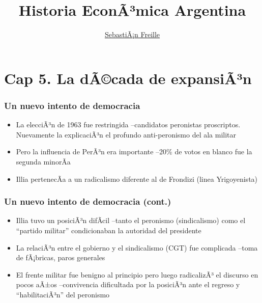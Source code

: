 \documentclass[14pt,aspectratio=169]{beamer}
\title{Historia EconÃ³mica Argentina}
\author{\underline{SebastiÃ¡n Freille} \inst{1}}
\institute[shortinst]{\inst{1} IEF-UNC \\ UCC}
\date{}
\begin{document}
{
  \begin{frame}
    \titlepage
  \end{frame}
}


\section{Cap 5. La dÃ©cada de expansiÃ³n}

\begin{frame}\frametitle{Un nuevo intento de democracia}
                 \begin{itemize}\itemsep 5pt \medskip
                 \item La elecciÃ³n de 1963 fue restringida
                   --candidatos peronistas proscriptos. Nuevamente la
                   explicaciÃ³n el profundo anti-peronismo del ala
                   militar
                   \item Pero la influencia de PerÃ³n era importante
                     --20\% de votos en blanco fue la segunda minorÃ­a
                     \item Illia pertenecÃ­a a un radicalismo diferente
                       al de Frondizi (linea Yrigoyenista)
                   \end{itemize}
               \end{frame}


               \begin{frame}\frametitle{Un nuevo intento de democracia
                 (cont.)}
                 \begin{itemize}\itemsep 5pt \medskip
                 \item Illia tuvo un posiciÃ³n difÃ­cil --tanto el
                   peronismo (sindicalismo) como el ``partido militar'' condicionaban
                   la autoridad del presidente
                   \item La relaciÃ³n entre el gobierno y el
                     sindicalismo (CGT) fue
                     complicada --toma de fÃ¡bricas, paros generales
                     \item El frente militar fue benigno al principio
                       pero luego radicalizÃ³ el discurso en pocos aÃ±os
                       --convivencia dificultada por la posiciÃ³n ante
                       el regreso y ``habilitaciÃ³n'' del peronismo
                   \end{itemize}
               \end{frame}
\end{document}
